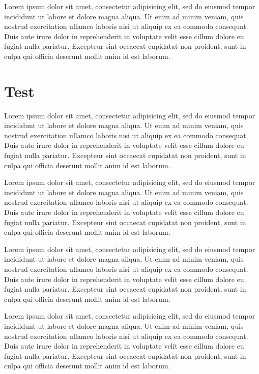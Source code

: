 \documentclass[10pt,a4paper,extrafontsizes,oldfontcommands,oneside]{memoir}
\begin{document}
Lorem ipsum dolor sit amet, consectetur adipisicing elit, sed do eiusmod tempor incididunt ut labore et dolore magna aliqua. Ut enim ad minim veniam, quis nostrud exercitation ullamco laboris nisi ut aliquip ex ea commodo consequat. Duis aute irure dolor in reprehenderit in voluptate velit esse cillum dolore eu fugiat nulla pariatur. Excepteur sint occaecat cupidatat non proident, sunt in culpa qui officia deserunt mollit anim id est laborum.


\chapter[Test TOC][Test Header]{Test} %
\label{chap:test}

Lorem ipsum dolor sit amet, consectetur adipisicing elit, sed do eiusmod tempor incididunt ut labore et dolore magna aliqua. Ut enim ad minim veniam, quis nostrud exercitation ullamco laboris nisi ut aliquip ex ea commodo consequat. Duis aute irure dolor in reprehenderit in voluptate velit esse cillum dolore eu fugiat nulla pariatur. Excepteur sint occaecat cupidatat non proident, sunt in culpa qui officia deserunt mollit anim id est laborum.

Lorem ipsum dolor sit amet, consectetur adipisicing elit, sed do eiusmod tempor incididunt ut labore et dolore magna aliqua. Ut enim ad minim veniam, quis nostrud exercitation ullamco laboris nisi ut aliquip ex ea commodo consequat. Duis aute irure dolor in reprehenderit in voluptate velit esse cillum dolore eu fugiat nulla pariatur. Excepteur sint occaecat cupidatat non proident, sunt in culpa qui officia deserunt mollit anim id est laborum.

Lorem ipsum dolor sit amet, consectetur adipisicing elit, sed do eiusmod tempor incididunt ut labore et dolore magna aliqua. Ut enim ad minim veniam, quis nostrud exercitation ullamco laboris nisi ut aliquip ex ea commodo consequat. Duis aute irure dolor in reprehenderit in voluptate velit esse cillum dolore eu fugiat nulla pariatur. Excepteur sint occaecat cupidatat non proident, sunt in culpa qui officia deserunt mollit anim id est laborum.

Lorem ipsum dolor sit amet, consectetur adipisicing elit, sed do eiusmod tempor incididunt ut labore et dolore magna aliqua. Ut enim ad minim veniam, quis nostrud exercitation ullamco laboris nisi ut aliquip ex ea commodo consequat. Duis aute irure dolor in reprehenderit in voluptate velit esse cillum dolore eu fugiat nulla pariatur. Excepteur sint occaecat cupidatat non proident, sunt in culpa qui officia deserunt mollit anim id est laborum.
\end{document}
